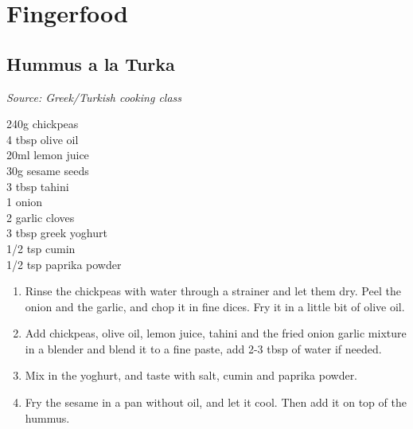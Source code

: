 \documentclass{report}
\begin{document}
\chapter{Fingerfood}
\section{Hummus a la Turka}
\textit{Source: Greek/Turkish cooking class}\\
\begin{minipage}[t]{0.21\textwidth} \vspace{0pt} 
240g chickpeas\\
4 tbsp olive oil\\
20ml lemon juice\\
30g sesame seeds\\
3 tbsp tahini\\
1 onion\\
2 garlic cloves\\
3 tbsp greek yoghurt\\
1/2 tsp cumin\\
1/2 tsp paprika powder
\end{minipage}
\hfill
\begin{minipage}[t]{0.78\textwidth} \vspace{0pt}
	\begin{enumerate}
		\item Rinse the chickpeas with water through a strainer and let them dry. Peel the onion and the garlic, and chop it in fine dices. Fry it in a little bit of olive oil.
		\item Add chickpeas, olive oil, lemon juice, tahini and the fried onion garlic mixture in a blender and blend it to a fine paste, add 2-3 tbsp of water if needed.
		\item Mix in the yoghurt, and taste with salt, cumin and paprika powder.
		\item Fry the sesame in a pan without oil, and let it cool. Then add it on top of the hummus.
	\end{enumerate}	
\end{minipage}
\end{document}

